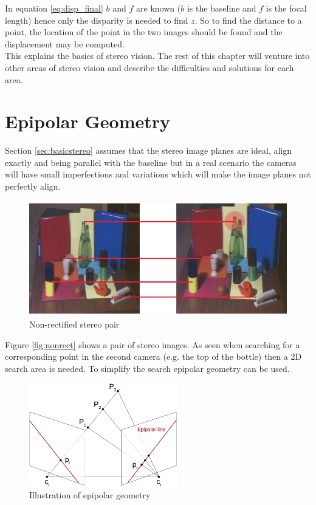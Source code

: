 In equation \vref{eq:disp_final} $b$ and $f$ are known ($b$ is the baseline and $f$ is the focal length) hence only the disparity is needed to find $z$. So to find the distance to a point, the location of the point in the two images should be found and the displacement may be computed. \\

This explains the basics of stereo vision. The rest of this chapter will venture into other areas of stereo vision and describe the difficulties and solutions for each area.

\section{Epipolar Geometry}
Section \ref{sec:basicstereo} assumes that the stereo image planes are ideal, align exactly and being parallel with the baseline but in a real scenario the cameras will have small imperfections and variations which will make the image planes not perfectly align.\\
\begin{figure}[ht!]
  \centering\includegraphics[height=5cm]{figures/nonrect.jpg}
  \caption{Non-rectified stereo pair\label{fig:nonrect} \cite{Mattoccia2013}}
\end{figure}
 
Figure \vref{fig:nonrect} shows a pair of stereo images. As seen when searching for a corresponding point in the second camera (e.g. the top of the bottle) then a 2D search area is needed. To simplify the search epipolar geometry can be used. \\

\begin{figure}[ht!]
  \centering
  \includegraphics[height=4.5cm]{figures/epipolarsimple}
  \caption{Illustration of epipolar geometry}
  \label{fig:epipolarsimple}
\end{figure}

